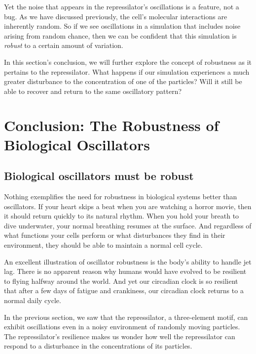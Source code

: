 Yet the noise that appears in the repressilator's oscillations is a feature, not a bug. As we have discussed previously, the cell's molecular interactions are inherently random. So if we see oscillations in a simulation that includes noise arising from random chance, then we can be confident that this simulation is \textit{robust} to a certain amount of variation.

In this section's conclusion, we will further explore the concept of robustness as it pertains to the repressilator. What happens if our simulation experiences a much greater disturbance to the concentration of one of the particles?  Will it still be able to recover and return to the same oscillatory pattern?\\

\FloatBarrier
{}

\section{Conclusion: The Robustness of Biological Oscillators}
\label{sec:biological_oscillators_must_be_robust}

\subsection{Biological oscillators must be robust}

Nothing exemplifies the need for robustness in biological systems better than oscillators. If your heart skips a beat when you are watching a horror movie, then it should return quickly to its natural rhythm. When you hold your breath to dive underwater, your normal breathing resumes at the surface. And regardless of what functions your cells perform or what disturbances they find in their environment, they should be able to maintain a normal cell cycle.

An excellent illustration of oscillator robustness is the body's ability to handle jet lag. There is no apparent reason why humans would have evolved to be resilient to flying halfway around the world. And yet our circadian clock is so resilient that after a few days of fatigue and crankiness, our circadian clock returns to a normal daily cycle.

In the previous section, we saw that the repressilator, a three-element motif, can exhibit oscillations even in a noisy environment of randomly moving particles. The repressilator's resilience makes us wonder how well the repressilator can respond to a disturbance in the concentrations of its particles.

